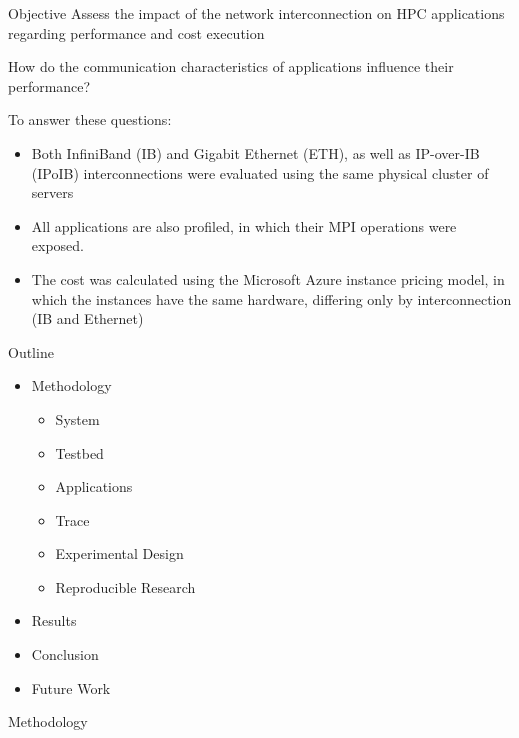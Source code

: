 \documentclass[presentation]{beamer}
\begin{document}
\begin{frame}{Objective}
\vfill
Assess the impact of the \alert{network interconnection} on HPC applications regarding performance and cost execution

\pause \vfill
How do the \alert{communication characteristics} of applications influence their performance?

\pause \vfill
To answer these questions:

\pause \vfill
\begin{itemize}
    \item  Both \alert{InfiniBand (IB)} and \alert{Gigabit Ethernet (ETH)}, as well as \alert{IP-over-IB (IPoIB)} interconnections were evaluated using the same physical cluster of servers
\pause \vfill
    \item All applications are also profiled, in which their MPI operations were exposed.
\pause \vfill
    \item The cost was calculated using the Microsoft Azure instance pricing model, in which the instances have the same hardware, differing only by interconnection (IB and Ethernet)
\end{itemize}
\vfill
\end{frame}

\begin{frame}{Outline}
\vfill
\Large
\begin{itemize}
\item Methodology
\begin{itemize}
\item System
\item Testbed
\item Applications
\item Trace
\item Experimental Design
\item Reproducible Research
\end{itemize}
\end{itemize}
\begin{itemize}
\item Results
\end{itemize}
\begin{itemize}
\item Conclusion
\item Future Work
\end{itemize}
\end{frame}

\begin{frame}  
\begin{block}{}
\begin{center}
\Huge{Methodology}
\end{center}
\end{block}
\end{frame}
\end{document}

